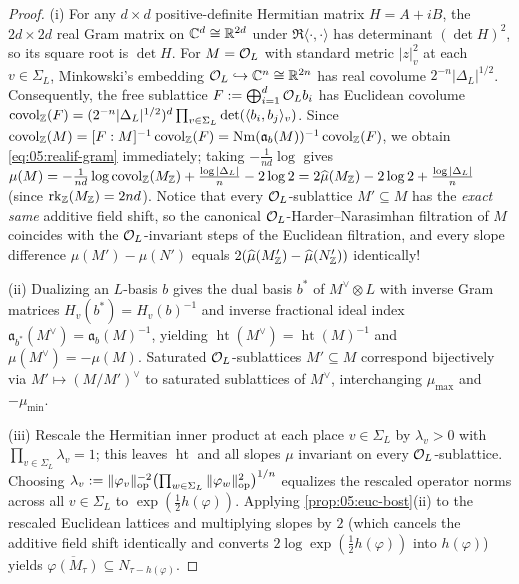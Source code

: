 
\begin{proof}
(i) For any $d \times d$ positive-definite Hermitian matrix $H = A + iB$, the $2d \times 2d$ real Gram matrix on $\mathbb{C}^d \cong \mathbb{R}^{2d}$ under $\Re\langle \cdot, \cdot \rangle$ has determinant $(\det H)^2$, so its square root is $\det H$. For $M = \mathcal{O}_L$ with standard metric $|z|_v^2$ at each $v \in \Sigma_L$, Minkowski's embedding $\mathcal{O}_L \hookrightarrow \mathbb{C}^n \cong \mathbb{R}^{2n}$ has real covolume $2^{-n}|\Delta_L|^{1/2}$. Consequently, the free sublattice $F := \bigoplus_{i=1}^d \mathcal{O}_L b_i$ has Euclidean covolume $\operatorname{covol}_{\mathbb{Z}}(F) = (2^{-n}|\Delta_L|^{1/2})^d \prod_{v \in \Sigma_L} \det(\langle b_i, b_j \rangle_v)$. Since $\operatorname{covol}_{\mathbb{Z}}(M) = [F : M]^{-1}\operatorname{covol}_{\mathbb{Z}}(F) = \operatorname{Nm}(\mathfrak{a}_b(M))^{-1}\operatorname{covol}_{\mathbb{Z}}(F)$, we obtain \eqref{eq:05:realif-gram} immediately; taking $-\frac{1}{nd}\log$ gives $\mu(M) = -\frac{1}{nd}\log\operatorname{covol}_{\mathbb{Z}}(M_{\mathbb{Z}}) + \frac{\log|\Delta_L|}{n} - 2\log 2 = 2\widehat{\mu}(M_{\mathbb{Z}}) - 2\log 2 + \frac{\log|\Delta_L|}{n}$ (since $\operatorname{rk}_{\mathbb{Z}}(M_{\mathbb{Z}}) = 2nd$). Notice that every $\mathcal{O}_L$-sublattice $M' \subseteq M$ has the \emph{exact same} additive field shift, so the canonical $\mathcal{O}_L$-Harder--Narasimhan filtration of $M$ coincides with the $\mathcal{O}_L$-invariant steps of the Euclidean filtration, and every slope difference $\mu(M') - \mu(N')$ equals $2(\widehat{\mu}(M'_{\mathbb{Z}}) - \widehat{\mu}(N'_{\mathbb{Z}}))$ identically!

(ii) Dualizing an $L$-basis $b$ gives the dual basis $b^*$ of $M^\vee \otimes L$ with inverse Gram matrices $H_v(b^*) = H_v(b)^{-1}$ and inverse fractional ideal index $\mathfrak{a}_{b^*}(M^\vee) = \mathfrak{a}_b(M)^{-1}$, yielding $\operatorname{ht}(M^\vee) = \operatorname{ht}(M)^{-1}$ and $\mu(M^\vee) = -\mu(M)$. Saturated $\mathcal{O}_L$-sublattices $M' \subseteq M$ correspond bijectively via $M' \mapsto (M/M')^\vee$ to saturated sublattices of $M^\vee$, interchanging $\mu_{\max}$ and $-\mu_{\min}$.

(iii) Rescale the Hermitian inner product at each place $v \in \Sigma_L$ by $\lambda_v > 0$ with $\prod_{v \in \Sigma_L} \lambda_v = 1$; this leaves $\operatorname{ht}$ and all slopes $\mu$ invariant on every $\mathcal{O}_L$-sublattice. Choosing $\lambda_v := \|\varphi_v\|_{\mathrm{op}}^{-2}\bigl(\prod_{w \in \Sigma_L} \|\varphi_w\|_{\mathrm{op}}^2\bigr)^{1/n}$ equalizes the rescaled operator norms across all $v \in \Sigma_L$ to $\exp(\frac{1}{2} h(\varphi))$. Applying \cref{prop:05:euc-bost}(ii) to the rescaled Euclidean lattices and multiplying slopes by $2$ (which cancels the additive field shift identically and converts $2\log\exp(\frac{1}{2}h(\varphi))$ into $h(\varphi)$) yields $\overline{\varphi(M_\tau)} \subseteq N_{\tau - h(\varphi)}$.
\end{proof}

